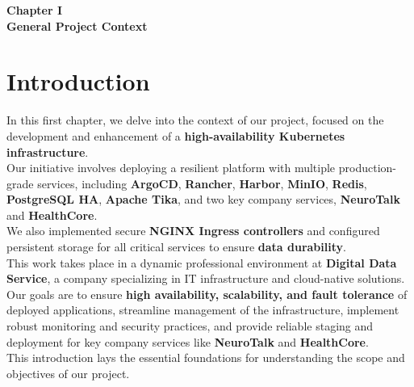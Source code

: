 \documentclass[a4paper,12pt]{report}
\begin{document}
\newpage
\renewcommand{\headrulewidth}{1pt}
\fancyhead[R]{\hspace*{4cm}}

\setcounter{chapter}{1}
\begin{doublespace}
{}
\vspace*{10cm}
\centering
\textbf{ \huge Chapter I \\ [1 cm] General Project Context}
\end{doublespace} 
\newpage 
\begin{doublespace}

\end{doublespace}

\fancyhead[R]{\nouppercase{\rightmark}}
\section*{Introduction}
\begin{doublespace}

\hspace{1cm}In this first chapter, we delve into the context of our project, focused on the development and enhancement of a \textbf{high-availability Kubernetes infrastructure}.\\
\hspace{1cm}Our initiative involves deploying a resilient platform with multiple production-grade services, including \textbf{ArgoCD}, \textbf{Rancher}, \textbf{Harbor}, \textbf{MinIO}, \textbf{Redis}, \textbf{PostgreSQL HA}, \textbf{Apache Tika}, and two key company services, \textbf{NeuroTalk} and \textbf{HealthCore}.\\
\hspace{1cm}We also implemented secure \textbf{NGINX Ingress controllers} and configured persistent storage for all critical services to ensure \textbf{data durability}.\\
\hspace{1cm}This work takes place in a dynamic professional environment at \textbf{Digital Data Service}, a company specializing in IT infrastructure and cloud-native solutions.\\
\hspace{1cm}Our goals are to ensure \textbf{high availability, scalability, and fault tolerance} of deployed applications, streamline management of the infrastructure, implement robust monitoring and security practices, and provide reliable staging and deployment for key company services like \textbf{NeuroTalk} and \textbf{HealthCore}.\\
\hspace{1cm}This introduction lays the essential foundations for understanding the scope and objectives of our project.
\end{doublespace}
\end{document}
